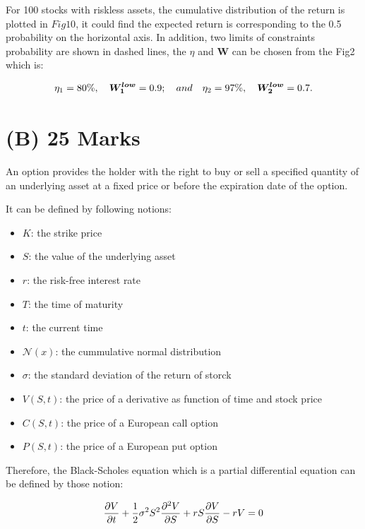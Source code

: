 \documentclass[sigconf]{acmart}
\begin{document}
For 100 stocks with riskless assets, the cumulative distribution of the return is plotted in $Fig10$, it could find the expected return is corresponding to the 0.5 probability on the horizontal axis. In addition, two limits of constraints probability are shown in dashed lines, the $\eta$ and $\bm{W}$ can be chosen from the Fig2 which is:

\begin{equation} \label{eq23}
\setlength{\abovedisplayskip}{3pt}
\setlength{\belowdisplayskip}{9pt}
\eta_1=80\%, \quad \bm{W_{1}^{low}}=0.9; \quad and \quad \eta_2=97\%, \quad \bm{W_{2}^{low}}=0.7.
\end{equation}

\section{(B) 25 Marks}

An option provides the holder with the right to buy or sell a specified quantity of an underlying asset at a fixed price or before the expiration date of the option.

It can be defined by following notions:
\begin{itemize}
\item 
$K$: the strike price
\item
$S$: the value of the underlying asset
\item
$r$: the risk-free interest rate
\item
$T$: the time of maturity
\item
$t$: the current time
\item
$\mathcal{N}(x)$: the cummulative normal distribution
\item
$\sigma$: the standard deviation of the return of storck
\item
$V(S,t)$: the price of a derivative as function of time and stock price
\item
$C(S,t)$: the price of a European call option
\item
$P(S,t)$: the price of a European put option
\end{itemize}

Therefore, the Black-Scholes equation which is a partial differential equation can be defined by those notion:

\begin{equation} \label{eq24}
\setlength{\abovedisplayskip}{3pt}
\setlength{\belowdisplayskip}{9pt}
\frac{\partial{V}}{\partial{t}} + \frac{1}{2}\sigma^{2}S^{2} \frac{\partial^{2}V}{\partial{S}} + rS \frac{\partial{V}}{\partial{S}} - rV=0
\end{equation}
\end{document}
